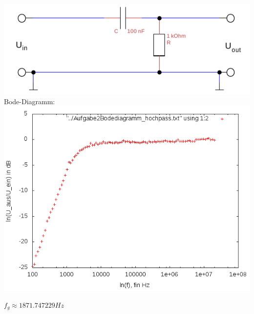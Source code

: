 \documentclass{article}
\begin{document}
\includegraphics[width=\textwidth]{../daten/Messdaten/plots/schalt_hoch}
Bode-Diagramm:\\
\includegraphics[width=\textwidth]{../daten/Messdaten/plots/Aufgabe2Bodediagramm_hochpass_gain}

$f_g \approx  1871.747229 Hz$
\end{document}
